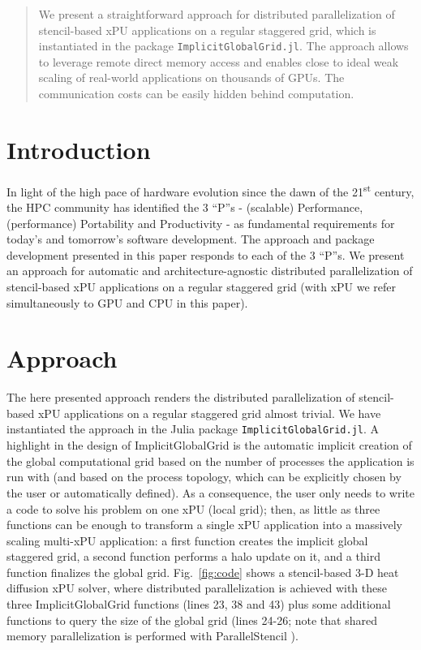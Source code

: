 \documentclass{juliacon}
\newcommand{\ts}{\textsuperscript}
\begin{document}


\maketitle

\begin{abstract}

We present a straightforward approach for distributed parallelization of stencil-based xPU applications on a regular staggered grid, which is instantiated in the package \texttt{ImplicitGlobalGrid.jl}. The approach allows to leverage remote direct memory access and enables close to ideal weak scaling of real-world applications on thousands of GPUs. The communication costs can be easily hidden behind computation.

\end{abstract}

\section{Introduction}
 In light of the high pace of hardware evolution since the dawn of the 21\ts{st} century, the HPC community has identified the 3 ``P''s - (scalable) Performance, (performance) Portability and Productivity - as fundamental requirements for today's and tomorrow's software development. The approach and package development presented in this paper responds to each of the 3 ``P''s. We present an approach for automatic and architecture-agnostic distributed parallelization of stencil-based xPU applications on a regular staggered grid (with xPU we refer simultaneously to GPU and CPU in this paper). 

\section{Approach}
The here presented approach renders the distributed parallelization of stencil-based xPU applications on a regular staggered grid almost trivial. We have instantiated the approach in the Julia package \texttt{ImplicitGlobalGrid.jl}. A highlight in the design of ImplicitGlobalGrid is the automatic implicit creation of the global computational grid based on the number of processes the application is run with (and based on the process topology, which can be explicitly chosen by the user or automatically defined). As a consequence, the user only needs to write a code to solve his problem on one xPU (local grid); then, as little as three functions can be enough to transform a single xPU application into a massively scaling multi-xPU application: a first function creates the implicit global staggered grid, a second function performs a halo update on it, and a third function finalizes the global grid. Fig.~\ref{fig:code} shows a stencil-based 3-D heat diffusion xPU solver, where distributed parallelization is achieved with these three ImplicitGlobalGrid functions (lines 23, 38 and 43) plus some additional functions to query the size of the global grid (lines 24-26; note that shared memory parallelization is performed with ParallelStencil \cite{parallelstencil2022}).
\end{document}
